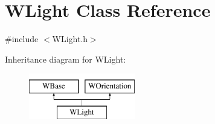 \hypertarget{class_w_light}{}\section{W\+Light Class Reference}
\label{class_w_light}


{\ttfamily \#include $<$W\+Light.\+h$>$}

Inheritance diagram for W\+Light\+:\begin{figure}[H]
\begin{center}
\leavevmode
\includegraphics[height=2.000000cm]{class_w_light}
\end{center}
\end{figure}
